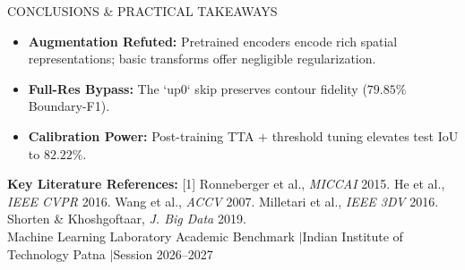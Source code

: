 \documentclass[10pt]{article}
\begin{document}
\begin{minipage}[t]{0.265\textwidth}
    \vspace{0.03in}

    \begin{bwcard}{CONCLUSIONS \& PRACTICAL TAKEAWAYS}
    {\fontsize{6.8}{8.2}\selectfont
    \begin{itemize}\setlength{\itemsep}{1pt}\setlength{\leftmargin}{8pt}\setlength{\parskip}{0pt}
        \item \textbf{Augmentation Refuted:} Pretrained encoders encode rich spatial representations; basic transforms offer negligible regularization.
        \item \textbf{Full-Res Bypass:} The `up0` skip preserves contour fidelity ($79.85\%$ Boundary-F1).
        \item \textbf{Calibration Power:} Post-training TTA + threshold tuning elevates test IoU to $\mathbf{82.22\%}$.
    \end{itemize}
    }
    \end{bwcard}
\end{minipage}

\vspace{0.03in}

\begin{tcolorbox}[
    enhanced,
    colback=bwblack,
    colframe=bwblack,
    boxrule=0.8pt,
    arc=2pt,
    top=2.5pt,
    bottom=2.5pt,
    left=6pt,
    right=6pt,
    boxsep=0pt
]
\centering
{\fontsize{6.8}{8.2}\selectfont \color{white}
\textbf{Key Literature References:} [1] Ronneberger et al., \emph{MICCAI} 2015. \quad [2] He et al., \emph{IEEE CVPR} 2016. \quad [3] Wang et al., \emph{ACCV} 2007. \quad [4] Milletari et al., \emph{IEEE 3DV} 2016. \quad [5] Shorten \& Khoshgoftaar, \emph{J. Big Data} 2019.\\
\color{gray!30} Machine Learning Laboratory Academic Benchmark \quad$|$\quad Indian Institute of Technology Patna \quad$|$\quad Session 2026--2027
}
\end{tcolorbox}
\end{document}
